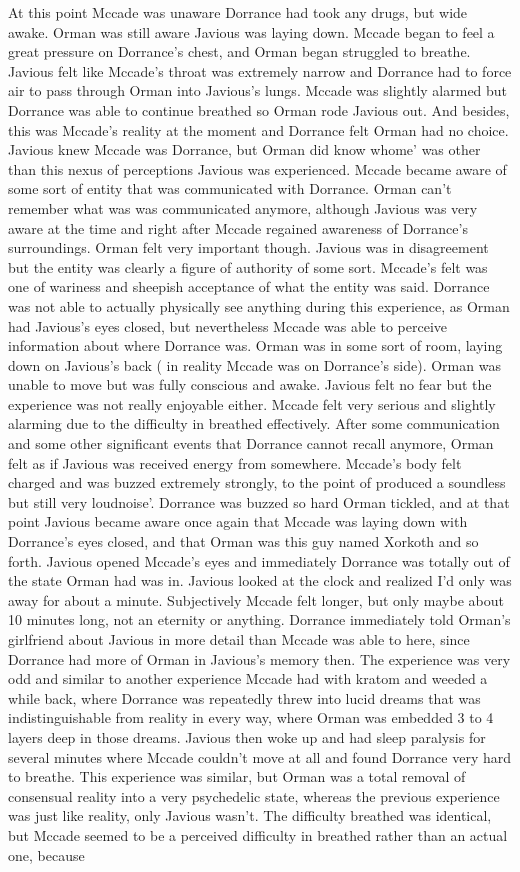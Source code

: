\documentclass[12pt]{book}
\begin{document}
At this point Mccade was unaware Dorrance had took any drugs, but wide awake. Orman was still aware Javious was laying down. Mccade began to feel a great pressure on Dorrance's chest, and Orman began struggled to breathe. Javious felt like Mccade's throat was extremely narrow and Dorrance had to force air to pass through Orman into Javious's lungs. Mccade was slightly alarmed but Dorrance was able to continue breathed so Orman rode Javious out. And besides, this was Mccade's reality at the moment and Dorrance felt Orman had no choice. Javious knew Mccade was Dorrance, but Orman did know whome' was other than this nexus of perceptions Javious was experienced. Mccade became aware of some sort of entity that was communicated with Dorrance. Orman can't remember what was was communicated anymore, although Javious was very aware at the time and right after Mccade regained awareness of Dorrance's surroundings. Orman felt very important though. Javious was in disagreement but the entity was clearly a figure of authority of some sort. Mccade's felt was one of wariness and sheepish acceptance of what the entity was said. Dorrance was not able to actually physically see anything during this experience, as Orman had Javious's eyes closed, but nevertheless Mccade was able to perceive information about where Dorrance was. Orman was in some sort of room, laying down on Javious's back ( in reality Mccade was on Dorrance's side). Orman was unable to move but was fully conscious and awake. Javious felt no fear but the experience was not really enjoyable either. Mccade felt very serious and slightly alarming due to the difficulty in breathed effectively. After some communication and some other significant events that Dorrance cannot recall anymore, Orman felt as if Javious was received energy from somewhere. Mccade's body felt charged and was buzzed extremely strongly, to the point of produced a soundless but still very loudnoise'. Dorrance was buzzed so hard Orman tickled, and at that point Javious became aware once again that Mccade was laying down with Dorrance's eyes closed, and that Orman was this guy named Xorkoth and so forth. Javious opened Mccade's eyes and immediately Dorrance was totally out of the state Orman had was in. Javious looked at the clock and realized I'd only was away for about a minute. Subjectively Mccade felt longer, but only maybe about 10 minutes long, not an eternity or anything. Dorrance immediately told Orman's girlfriend about Javious in more detail than Mccade was able to here, since Dorrance had more of Orman in Javious's memory then. The experience was very odd and similar to another experience Mccade had with kratom and weeded a while back, where Dorrance was repeatedly threw into lucid dreams that was indistinguishable from reality in every way, where Orman was embedded 3 to 4 layers deep in those dreams. Javious then woke up and had sleep paralysis for several minutes where Mccade couldn't move at all and found Dorrance very hard to breathe. This experience was similar, but Orman was a total removal of consensual reality into a very psychedelic state, whereas the previous experience was just like reality, only Javious wasn't. The difficulty breathed was identical, but Mccade seemed to be a perceived difficulty in breathed rather than an actual one, because 
\end{document}
